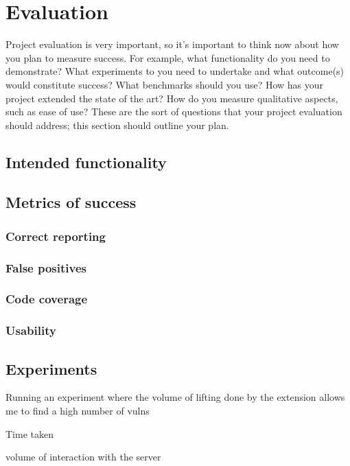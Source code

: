 
\chapter{Evaluation}

Project evaluation is very important, so it's important to think now about how you plan to measure success. For example, what functionality do you need to demonstrate?  What experiments to you need to undertake and what outcome(s) would constitute success?  What benchmarks should you use? How has your project extended the state of the art?  How do you measure qualitative aspects, such as ease of use?  These are the sort of questions that your project evaluation should address; this section should outline your plan.


\section{Intended functionality}

\section{Metrics of success}

\subsection{Correct reporting}

\subsection{False positives}

\subsection{Code coverage}

\subsection{Usability}

\section{Experiments}

Running an experiment where the volume of lifting done by the extension allows me to find a high number of vulns

Time taken

volume of interaction with the server

